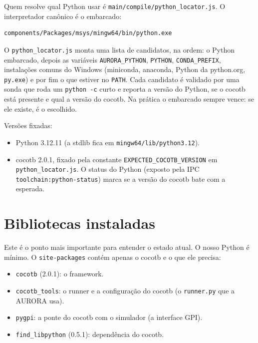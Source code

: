 \documentclass[11pt,a4paper]{article}
\begin{document}
Quem resolve qual Python usar é \texttt{main/compile/python\_locator.js}. O
interpretador canônico é o embarcado:

\begin{lstlisting}[language=bash]
components/Packages/msys/mingw64/bin/python.exe
\end{lstlisting}

O \texttt{python\_locator.js} monta uma lista de candidatos, na ordem: o Python
embarcado, depois as variáveis \texttt{AURORA\_PYTHON}, \texttt{PYTHON},
\texttt{CONDA\_PREFIX}, instalações comuns do Windows (miniconda, anaconda,
Python da python.org, \texttt{py.exe}) e por fim o que estiver no \texttt{PATH}.
Cada candidato é validado por uma sonda que roda um \texttt{python -c} curto e
reporta a versão do Python, se o cocotb está presente e qual a versão do cocotb.
Na prática o embarcado sempre vence: se ele existe, é o escolhido.

Versões fixadas:

\begin{itemize}
  \item Python 3.12.11 (a stdlib fica em \texttt{mingw64/lib/python3.12}).
  \item cocotb 2.0.1, fixado pela constante \texttt{EXPECTED\_COCOTB\_VERSION} em
        \texttt{python\_locator.js}. O status do Python (exposto pela IPC
        \texttt{toolchain:python-status}) marca se a versão do cocotb bate com a
        esperada.
\end{itemize}

\section{Bibliotecas instaladas}

Este é o ponto mais importante para entender o estado atual. O nosso Python é
mínimo. O \texttt{site-packages} contém apenas o cocotb e o que ele precisa:

\begin{itemize}
  \item \texttt{cocotb} (2.0.1): o framework.
  \item \texttt{cocotb\_tools}: o runner e a configuração do cocotb (o
        \texttt{runner.py} que a AURORA usa).
  \item \texttt{pygpi}: a ponte do cocotb com o simulador (a interface GPI).
  \item \texttt{find\_libpython} (0.5.1): dependência do cocotb.
\end{itemize}
\end{document}
